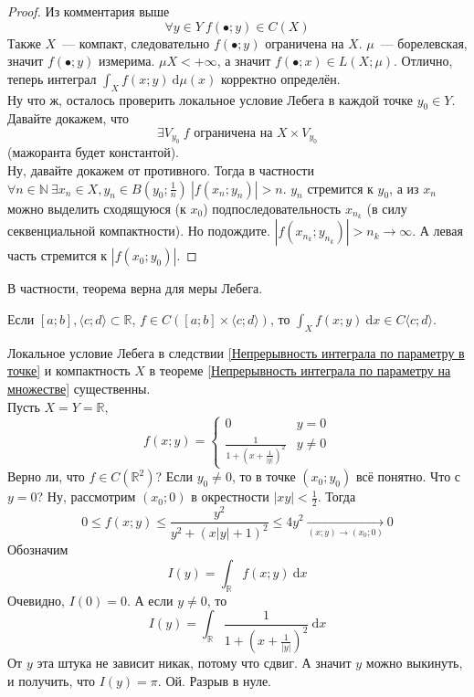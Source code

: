 \documentclass{article}
\begin{document}
    \begin{proof}
        Из комментария выше
        $$
        \forall y\in Y~f(\bullet;y)\in C(X)
        $$
        Также $X$~--- компакт, следовательно $f(\bullet;y)$ ограничена на $X$. $\mu$~--- борелевская, значит $f(\bullet;y)$ измерима. $\mu X<+\infty$, а значит $f(\bullet;x)\in L(X;\mu)$. Отлично, теперь интеграл $\int_Xf(x;y)~\mathrm d\mu(x)$ корректно определён.\\
        Ну что ж, осталось проверить локальное условие Лебега в каждой точке $y_0\in Y$. Давайте докажем, что
        $$
        \exists V_{y_0}~f\text{ ограничена на }X\times V_{y_0}
        $$
        (мажоранта будет константой).\\
        Ну, давайте докажем от противного. Тогда в частности $\forall n\in\mathbb N~\exists x_n\in X,y_n\in B(y_0;\frac1n)~|f(x_n;y_n)|>n$. $y_n$ стремится к $y_0$, а из $x_n$ можно выделить сходящуюся (к $x_0$) подпоследовательность $x_{n_k}$ (в силу секвенциальной компактности). Но подождите. $|f(x_{n_k};y_{n_k})|>n_k\to\infty$. А левая часть стремится к $|f(x_0;y_0)|$.
    \end{proof}
    \begin{remark}
        В частности, теорема верна для меры Лебега.
    \end{remark}
    \begin{corollary}
        Если $[a;b],\langle c;d\rangle\subset\mathbb R$, $f\in C([a;b]\times\langle c;d\rangle)$, то $\int_Xf(x;y)~\mathrm dx\in C\langle c;d\rangle$.
    \end{corollary}
    \begin{example}
        Локальное условие Лебега в следствии \ref{Непрерывность интеграла по параметру в точке} и компактность $X$ в теореме \ref{Непрерывность интеграла по параметру на множестве} существенны.\\
        Пусть $X=Y=\mathbb R$,
        $$
        f(x;y)=\begin{cases}
            0 & y=0\\
            \frac1{1+\left(x+\frac1{|y|}\right)^2} & y\neq0
        \end{cases}
        $$
        Верно ли, что $f\in C(\mathbb R^2)$? Если $y_0\neq0$, то в точке $(x_0;y_0)$ всё понятно. Что с $y=0$? Ну, рассмотрим $(x_0;0)$ в окрестности $|xy|<\frac12$. Тогда
        $$
        0\leqslant f(x;y)\leqslant\frac{y^2}{y^2+(x|y|+1)^2}\leqslant4y^2\underset{(x;y)\to(x_0;0)}\longrightarrow0
        $$
        Обозначим
        $$
        I(y)=\int_{\mathbb R} f(x;y)~\mathrm dx
        $$
        Очевидно, $I(0)=0$. А если $y\neq0$, то
        $$
        I(y)=\int_{\mathbb R}\frac1{1+\left(x+\frac1{|y|}\right)^2}~\mathrm dx
        $$
        От $y$ эта штука не зависит никак, потому что сдвиг. А значит $y$ можно выкинуть, и получить, что $I(y)=\pi$. Ой. Разрыв в нуле.
    \end{example}
\end{document}

